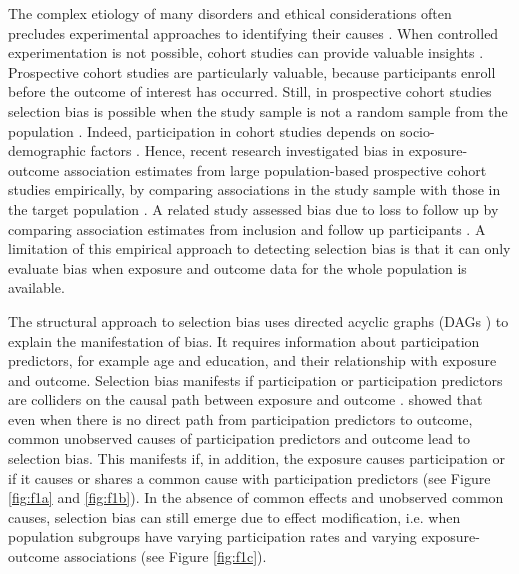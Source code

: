 \documentclass[12pt]{article}
\begin{document}
The complex etiology of many disorders and ethical considerations often precludes experimental approaches to identifying their causes \cite{Rothman2008-sq}. When controlled experimentation is not possible, cohort studies can provide valuable insights \cite{Greenland2017-qr}. Prospective cohort studies are particularly valuable, because participants enroll before the outcome of interest has occurred. Still, in prospective cohort studies selection bias is possible when the study sample is not a random sample from the population \cite{Hernan2004-oz}. Indeed, participation in cohort studies depends on socio-demographic factors \cite{Galea2007-hv}. Hence, recent research investigated bias in exposure-outcome association estimates from large population-based prospective cohort studies empirically, by comparing associations in the study sample with those in the target population \cite{Nilsen2009-ci, Nohr2006-uf, Nohr2018-sn, Hatch2016-us}.
A related study assessed bias due to loss to follow up by comparing association estimates from inclusion and follow up participants \cite{Greene2011-am}. A limitation of this empirical approach to detecting selection bias is that it can only evaluate bias when exposure and outcome data for the whole population is available.

The structural approach to selection bias uses directed acyclic graphs (DAGs \cite{Pearl1995-ss}) to explain the manifestation of bias. It requires information about participation predictors, for example age and education, and their relationship with exposure and outcome. Selection bias manifests if participation or participation predictors are colliders on the causal path between exposure and outcome \cite{Cole2010-za}. \citeauthor{Hernan2004-oz} \cite{Hernan2004-oz} showed that even when there is no direct path from participation predictors to outcome, common unobserved causes of participation predictors and outcome lead to selection bias. This manifests if, in addition, the exposure causes participation or if it causes or shares a common cause with participation predictors (see Figure \ref{fig:f1a} and \ref{fig:f1b}). In the absence of common effects and unobserved common causes, selection bias can still emerge due to effect modification, i.e. when population subgroups have varying participation rates and varying exposure-outcome associations (see Figure \ref{fig:f1c}).
\end{document}
